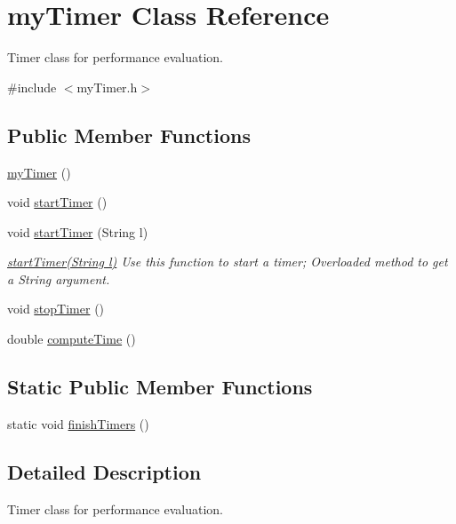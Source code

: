 \hypertarget{classmyTimer}{\section{my\-Timer Class Reference}
\label{classmyTimer}
}


Timer class for performance evaluation.  




{\ttfamily \#include $<$my\-Timer.\-h$>$}

\subsection*{Public Member Functions}
\begin{DoxyCompactItemize}
\item 
\hyperlink{classmyTimer_aa2a86aa5e6cba6148bf4bf99c368d93c}{my\-Timer} ()
\item 
void \hyperlink{classmyTimer_ace0154f83f62150b7ff0a056599aa95d}{start\-Timer} ()
\item 
void \hyperlink{classmyTimer_a659c08ad5284b7dd7053e307dab6b1c7}{start\-Timer} (String l)
\begin{DoxyCompactList}\small\item\em \hyperlink{classmyTimer_a659c08ad5284b7dd7053e307dab6b1c7}{start\-Timer(\-String l)} Use this function to start a timer; Overloaded method to get a String argument. \end{DoxyCompactList}\item 
void \hyperlink{classmyTimer_ae785e8e093301952ff4c0775aeccbddc}{stop\-Timer} ()
\item 
double \hyperlink{classmyTimer_a233683b99e90c228249d4601687c9b76}{compute\-Time} ()
\end{DoxyCompactItemize}
\subsection*{Static Public Member Functions}
\begin{DoxyCompactItemize}
\item 
static void \hyperlink{classmyTimer_a64f5e038c85c0acf2bc833cf72bf397b}{finish\-Timers} ()
\end{DoxyCompactItemize}


\subsection{Detailed Description}
Timer class for performance evaluation. 

